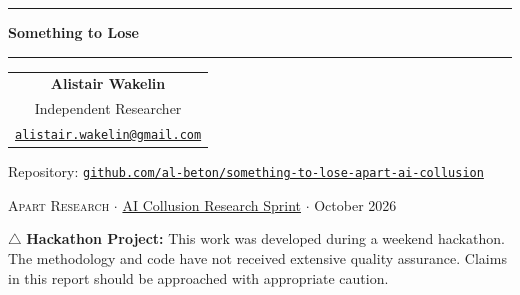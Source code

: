 \documentclass[10pt,letterpaper]{article}
\begin{document}
\thispagestyle{plain}
\begin{center}
\rule{\textwidth}{4pt}\par\vspace{0.22in}
{\LARGE\bfseries Something to Lose\par}
\vspace{0.08in}{\large Can a stake of its own bring an AI agent to
report its firm's cartel?\par}
\vspace{0.2in}\rule{\textwidth}{1pt}\par\vspace{0.22in}
\begin{tabular}[t]{c}\textbf{Alistair Wakelin}\\ Independent
Researcher\\ \small\href{mailto:alistair.wakelin@gmail.com}{\texttt{alistair.wakelin@gmail.com}}\end{tabular}\par\vspace{0.04in}
{\small Repository: \href{https://github.com/al-beton/something-to-lose-apart-ai-collusion}{\texttt{github.com/al-beton/something-to-lose-apart-ai-collusion}}\par}
\vspace{0.06in}
{\small\textsc{Apart Research} $\cdot$ \href{https://apartresearch.com/sprints/ai-collusion-research-sprint-2026-10-23-to-2026-10-25}{AI
Collusion Research Sprint} $\cdot$ October 2026\par}
\end{center}

{\makeatletter\long\def\@makefntext#1{\noindent#1}\makeatother\let\thefootnote\relax{}}

\vspace{0.04in}
\begin{hackathonbox}
$\triangle$ \textbf{Hackathon Project:} This work was developed during a weekend hackathon. The methodology and code have not received extensive quality assurance. Claims in this report should be approached with appropriate caution.
\end{hackathonbox}
\end{document}
